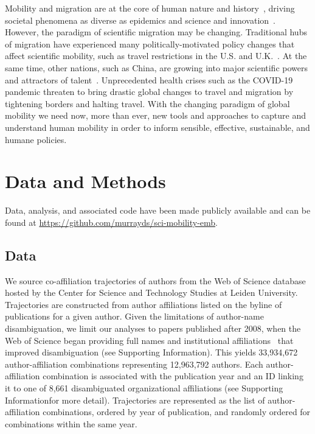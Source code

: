 \documentclass[12pt]{article} %
\def\SI{Supporting Information}
\begin{document}
Mobility and migration are at the core of human nature and history~\autocite{shah2020migration}, driving societal phenomena as diverse as epidemics\autocite{kraemer2020covid, truscott2012epidemicgravity, xia2005measlesgravity} and science and innovation~\autocite{kaiser2018innovation, armano2017innovation, sugimoto2017mostimpact, petersen2018multiscale, franzoni2014advantage, morgan2018prestige, rodrigues2016mobility}.
However, the paradigm of scientific migration may be changing.
Traditional hubs of migration have experienced many politically-motivated policy changes that affect scientific mobility, such as travel restrictions in the U.S. and U.K.~\autocite{chinchilla2018travelban}.
At the same time, other nations, such as China, are growing into major scientific powers and attractors of talent~\autocite{tollefson2018china, cao2020returning}.
Unprecedented health crises such as the COVID-19 pandemic threaten to bring drastic global changes to travel and migration by tightening borders and halting travel.
With the changing paradigm of global mobility we need now, more than ever, new tools and approaches to capture and understand human mobility in order to inform sensible, effective, sustainable, and humane policies.

%
%
\section*{Data and Methods}
\label{sec:datamethods} %

Data, analysis, and associated code have been made publicly available and can be found at \url{https://github.com/murrayds/sci-mobility-emb}.

\subsection*{Data}
We source co-affiliation trajectories of authors from the Web of Science database hosted by the Center for Science and Technology Studies at Leiden University.
Trajectories are constructed from author affiliations listed on the byline of publications for a given author.
Given the limitations of author-name disambiguation, we limit our analyses to papers published after 2008, when the Web of Science began providing full names and institutional affiliations~\autocite{caron2014disambiguation} that improved disambiguation (see \SI).
This yields 33,934,672 author-affiliation combinations representing 12,963,792 authors.
Each author-affiliation combination is associated with the publication year and an ID linking it to one of 8,661 disambiguated organizational affiliations (see \SI for more detail).
Trajectories are represented as the list of author-affiliation combinations, ordered by year of publication, and randomly ordered for combinations within the same year.
\end{document}
